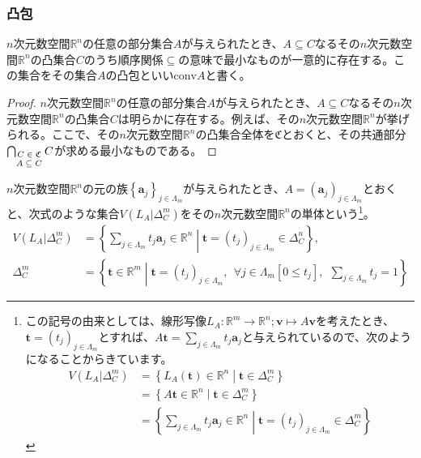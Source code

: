 \documentclass[dvipdfmx]{jsarticle}
\begin{document}
\subsubsection{凸包}%
\begin{thm}\label{8.2.2.26}
$n$次元数空間$\mathbb{R}^{n}$の任意の部分集合$A$が与えられたとき、$A \subseteq C$なるその$n$次元数空間$\mathbb{R}^{n}$の凸集合$C$のうち順序関係$\subseteq$の意味で最小なものが一意的に存在する。この集合をその集合$A$の凸包といい$\mathrm{conv}A$と書く。
\end{thm}
\begin{proof}
$n$次元数空間$\mathbb{R}^{n}$の任意の部分集合$A$が与えられたとき、$A \subseteq C$なるその$n$次元数空間$\mathbb{R}^{n}$の凸集合$C$は明らかに存在する。例えば、その$n$次元数空間$\mathbb{R}^{n}$が挙げられる。ここで、その$n$次元数空間$\mathbb{R}^{n}$の凸集合全体を$\mathfrak{C}$とおくと、その共通部分$\bigcap_{\scriptsize \begin{matrix}
C\in \mathfrak{C} \\
A \subseteq C \\
\end{matrix}} C$が求める最小なものである。
\end{proof}
\begin{dfn}
$n$次元数空間$\mathbb{R}^{n}$の元の族$\left\{ \mathbf{a}_{j} \right\}_{j \in \varLambda_{m}}$が与えられたとき、$A = \left( \mathbf{a}_{j} \right)_{j \in \varLambda_{m}}$とおくと、次式のような集合$V\left( L_{A}|\varDelta_{C}^{m} \right)$をその$n$次元数空間$\mathbb{R}^{n}$の単体という\footnote{この記号の由来としては、線形写像$L_{A}:\mathbb{R}^{m} \rightarrow \mathbb{R}^{n};\mathbf{v} \mapsto A\mathbf{v}$を考えたとき、$\mathbf{t} = \left( t_{j} \right)_{j \in \varLambda_{m}}$とすれば、$A\mathbf{t} = \sum_{j \in \varLambda_{m}} {t_{j}\mathbf{a}_{j}}$と与えられているので、次のようになることからきています。
\begin{align*}
V\left( L_{A}|\varDelta_{C}^{m} \right) &= \left\{ L_{A}\left( \mathbf{t} \right) \in \mathbb{R}^{n} \middle| \mathbf{t} \in \varDelta_{C}^{m} \right\}\\
&= \left\{ A\mathbf{t} \in \mathbb{R}^{n} \middle| \mathbf{t} \in \varDelta_{C}^{m} \right\}\\
&= \left\{ \sum_{j \in \varLambda_{m}} {t_{j}\mathbf{a}_{j}} \in \mathbb{R}^{n} \middle| \mathbf{t} = \left( t_{j} \right)_{j \in \varLambda_{m}} \in \varDelta_{C}^{m} \right\}
\end{align*}}。
\begin{align*}
V\left( L_{A}|\varDelta_{C}^{m} \right) &= \left\{ \sum_{j \in \varLambda_{m}} {t_{j}\mathbf{a}_{j}} \in \mathbb{R}^{n} \middle| \mathbf{t} = \left( t_{j} \right)_{j \in \varLambda_{m}} \in \varDelta_{C}^{n} \right\},\\
\varDelta_{C}^{m} &= \left\{ \mathbf{t} \in \mathbb{R}^{m} \middle| \mathbf{t} = \left( t_{j} \right)_{j \in \varLambda_{m}},\ \ \forall j \in \varLambda_{m}\left[ 0 \leq t_{j} \right],\ \ \sum_{j \in \varLambda_{m}} t_{j} = 1 \right\}
\end{align*}
\end{dfn}
\end{document}

